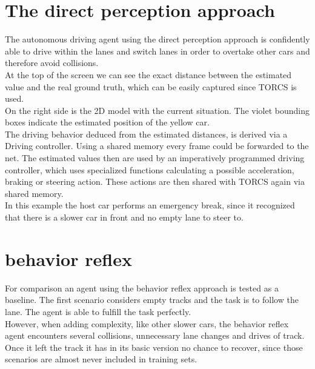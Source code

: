 \documentclass[11pt]{article}
\begin{document}
\section{The direct perception approach}

The autonomous driving agent using the direct perception approach is confidently able to drive within the lanes and switch lanes in order to overtake other cars and therefore avoid collisions.\\

At the top of the screen we can see the exact distance between the estimated value and the real ground truth, which can be easily captured since TORCS is used.\\

On the right side is the 2D model with the current situation. The violet bounding boxes indicate the estimated position of the yellow car.\\

The driving behavior deduced from the estimated distances, is derived via a Driving controller. Using a shared memory every frame could be forwarded to the net. The estimated values then are used by an imperatively programmed driving controller, which uses specialized functions calculating a possible acceleration, braking or steering action. These actions are then shared with TORCS again via shared memory.\\

In this example the host car performs an emergency break, since it recognized that there is a slower car in front and no empty lane to steer to.


\section{behavior reflex}

For comparison an agent using the behavior reflex approach is tested as a baseline.
The first scenario considers empty tracks and the task is to follow the lane.
The agent is able to fulfill the task perfectly.\\

However, when adding complexity, like other slower cars, the behavior reflex agent encounters several collisions, unnecessary lane changes and drives of track.\\

Once it left the track it has in its basic version no chance to recover, since those scenarios are almost never included in training sets.
\end{document}
